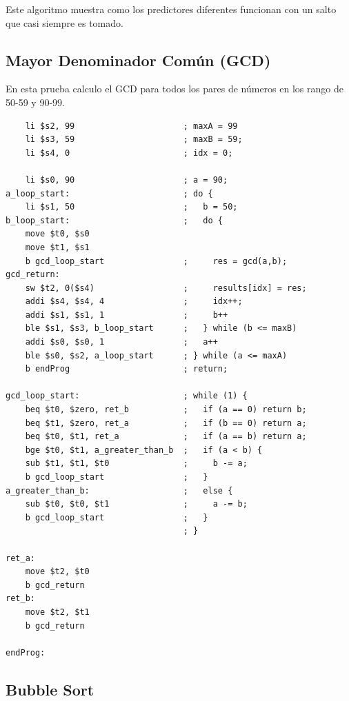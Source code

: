 \documentclass[a4paper]{article}
\begin{document}
Este algoritmo muestra como los predictores diferentes funcionan con un salto que casi siempre es tomado.

\subsection{Mayor Denominador Común (GCD)}

En esta prueba calculo el GCD para todos los pares de números en los rango de 50-59 y 90-99.

\begin{verbatim}
    li $s2, 99                      ; maxA = 99
    li $s3, 59                      ; maxB = 59;
    li $s4, 0                       ; idx = 0;

    li $s0, 90                      ; a = 90;
a_loop_start:                       ; do {
    li $s1, 50                      ;   b = 50;
b_loop_start:                       ;   do {
    move $t0, $s0
    move $t1, $s1
    b gcd_loop_start                ;     res = gcd(a,b);
gcd_return:
    sw $t2, 0($s4)                  ;     results[idx] = res;
    addi $s4, $s4, 4                ;     idx++;
    addi $s1, $s1, 1                ;     b++
    ble $s1, $s3, b_loop_start      ;   } while (b <= maxB)
    addi $s0, $s0, 1                ;   a++
    ble $s0, $s2, a_loop_start      ; } while (a <= maxA)
    b endProg                       ; return;

gcd_loop_start:                     ; while (1) {
    beq $t0, $zero, ret_b           ;   if (a == 0) return b;
    beq $t1, $zero, ret_a           ;   if (b == 0) return a;
    beq $t0, $t1, ret_a             ;   if (a == b) return a;
    bge $t0, $t1, a_greater_than_b  ;   if (a < b) {
    sub $t1, $t1, $t0               ;     b -= a;
    b gcd_loop_start                ;   }
a_greater_than_b:                   ;   else {
    sub $t0, $t0, $t1               ;     a -= b;
    b gcd_loop_start                ;   }
                                    ; }

ret_a:
    move $t2, $t0
    b gcd_return
ret_b:
    move $t2, $t1
    b gcd_return

endProg:
\end{verbatim}

\subsection{Bubble Sort}
\end{document}
